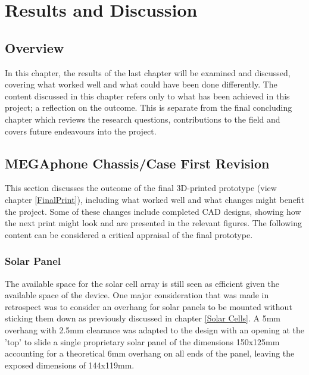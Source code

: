 
\chapter{Results and Discussion} %

\label{Chapter5} %


\section{Overview}
In this chapter, the results of the last chapter will be examined and discussed, covering what worked well and what could have been done differently.
The content discussed in this chapter refers only to what has been achieved in this project; a reflection on the outcome.
This is separate from the final concluding chapter which reviews the research questions, contributions to the field and covers future endeavours into the project.


\section{MEGAphone Chassis/Case First Revision}
This section discusses the outcome of the final 3D-printed prototype (view chapter \ref{FinalPrint}), including what worked well and what changes might benefit the project.
Some of these changes include completed CAD designs, showing how the next print might look and are presented in the relevant figures.
The following content can be considered a critical appraisal of the final prototype.

\subsection{Solar Panel}

The available space for the solar cell array is still seen as efficient given the available space of the device.
One major consideration that was made in retrospect was to consider an overhang for solar panels to be mounted without sticking them down as previously discussed in chapter \ref{Solar Cells}.
A 5mm overhang with 2.5mm clearance was adapted to the design with an opening at the 'top' to slide a single proprietary solar panel of the dimensions 150x125mm accounting for a theoretical 6mm overhang on all ends of the panel, leaving the exposed dimensions of 144x119mm.

